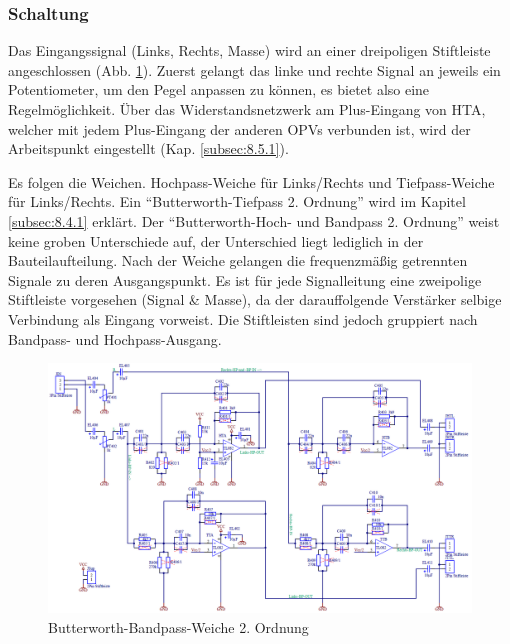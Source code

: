 \subsubsection{Schaltung}\label{subsec:5.4.2}
Das Eingangssignal (Links, Rechts, Masse) wird an einer dreipoligen Stiftleiste angeschlossen (Abb. \ref{fig:5.4.2.1}).
Zuerst gelangt das linke und rechte Signal an jeweils ein Potentiometer, um den Pegel anpassen zu können, es bietet also eine Regelmöglichkeit.
Über das Widerstandsnetzwerk am Plus-Eingang von HTA, welcher mit jedem Plus-Eingang der anderen OPVs verbunden ist, wird der Arbeitspunkt eingestellt (Kap. \ref{subsec:8.5.1}). 

\newpage
Es folgen die Weichen.
Hochpass-Weiche für Links/Rechts und Tiefpass-Weiche für Links/Rechts.
Ein \enquote{Butterworth-Tiefpass 2. Ordnung} wird im Kapitel \ref{subsec:8.4.1} erklärt.
Der \enquote{Butterworth-Hoch- und Bandpass 2. Ordnung} weist keine groben Unterschiede auf, der Unterschied liegt lediglich in der Bauteilaufteilung.
Nach der Weiche gelangen die frequenzmäßig getrennten Signale zu deren Ausgangspunkt. Es ist für jede Signalleitung eine zweipolige Stiftleiste vorgesehen (Signal \& Masse), da der darauffolgende Verstärker selbige Verbindung als Eingang vorweist.
Die Stiftleisten sind jedoch gruppiert nach Bandpass- und Hochpass-Ausgang.
\begin{figure} [H]
	\centering	
	\includegraphics[width=1\textwidth]{img/Print4/4_TTuHTWeiche-Schematic.PNG}
	\caption{Butterworth-Bandpass-Weiche 2. Ordnung}
	\label {fig:5.4.2.1}
\end{figure}

